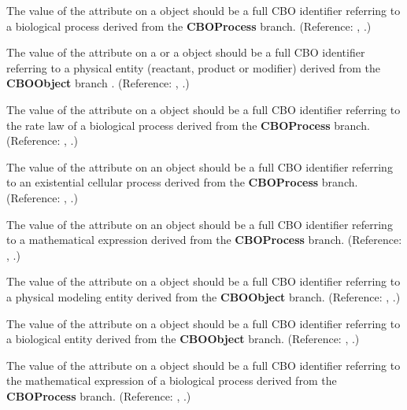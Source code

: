  {The value of the attribute  on a \Reaction object should be a full CBO identifier referring to a biological process derived from the \textbf{CBO\textunderscore Process} branch.  (Reference: \sbmlthreedynamic, .)}

 {The value of the attribute  on a \SpeciesReference or a \ModifierSpeciesReference object should be a full CBO identifier referring to a physical entity (reactant, product or modifier) derived from the \textbf{CBO\textunderscore Object} branch .  (Reference: \sbmlthreedynamic, .)}

 {The value of the attribute  on a \KineticLaw object should be a full CBO identifier referring to the rate law of a biological process derived from the \textbf{CBO\textunderscore Process} branch. (Reference: \sbmlthreedynamic, .)}

 {The value of the attribute  on an \Event object should be a full CBO identifier referring to an existential cellular process derived from the \textbf{CBO\textunderscore Process} branch. (Reference: \sbmlthreedynamic, .)}

 {The value of the attribute  on an \EventAssignment object should be a full CBO identifier referring to a mathematical expression derived from the \textbf{CBO\textunderscore Process} branch. (Reference: \sbmlthreedynamic, .)}

 {The value of the attribute  on a \Compartment object should be a full CBO identifier referring to a physical modeling entity derived from the \textbf{CBO\textunderscore Object} branch. (Reference: \sbmlthreedynamic, .)}

 {The value of the attribute  on a \Species object should be a full CBO identifier referring to a biological entity derived from the \textbf{CBO\textunderscore Object} branch.  (Reference: \sbmlthreedynamic, .)}

 {The value of the attribute  on a \Trigger object should be a full CBO identifier referring to the mathematical expression of a biological process derived from the \textbf{CBO\textunderscore Process} branch. (Reference: \sbmlthreedynamic, .)}

